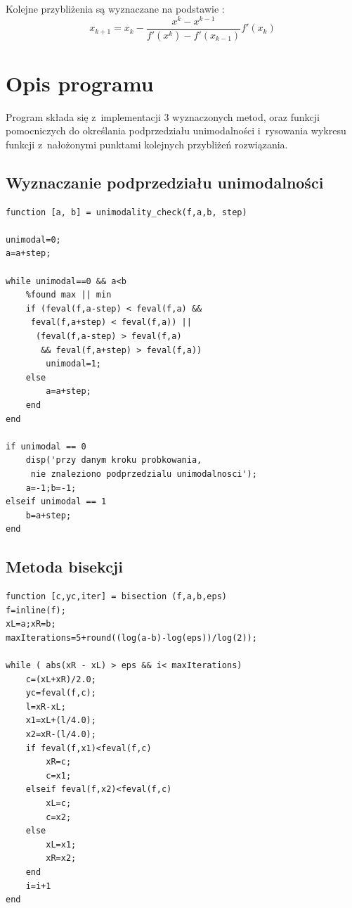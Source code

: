 \documentclass{classrep}
\begin{document}
Kolejne przybliżenia są wyznaczane na podstawie :
\begin{equation}
x_{k+1} = x_k - \frac{x^k-x^{k-1}}{f'(x^k)-f'(x_{k-1})} f'(x_k)
\end{equation}

\section{Opis programu}

Program składa się z~implementacji 3 wyznaczonych metod, oraz funkcji pomocniczych do określania podprzedziału unimodalności i~rysowania wykresu funkcji z~nałożonymi punktami kolejnych przybliżeń rozwiązania.

\subsection{Wyznaczanie podprzedziału unimodalności}
\begin{lstlisting}
function [a, b] = unimodality_check(f,a,b, step)

unimodal=0;
a=a+step;

while unimodal==0 && a<b
    %found max || min
    if (feval(f,a-step) < feval(f,a) &&
     feval(f,a+step) < feval(f,a)) ||
      (feval(f,a-step) > feval(f,a)
       && feval(f,a+step) > feval(f,a))
        unimodal=1;
    else
        a=a+step;
    end
end

if unimodal == 0
    disp('przy danym kroku probkowania,
     nie znaleziono podprzedzialu unimodalnosci');
    a=-1;b=-1; 
elseif unimodal == 1
    b=a+step;
end
\end{lstlisting}

\subsection{Metoda bisekcji}
\begin{lstlisting}
function [c,yc,iter] = bisection (f,a,b,eps)
f=inline(f);
xL=a;xR=b;
maxIterations=5+round((log(a-b)-log(eps))/log(2));

while ( abs(xR - xL) > eps && i< maxIterations)
    c=(xL+xR)/2.0;
    yc=feval(f,c);
    l=xR-xL;
    x1=xL+(l/4.0);
    x2=xR-(l/4.0);
    if feval(f,x1)<feval(f,c)
        xR=c;
        c=x1;
    elseif feval(f,x2)<feval(f,c)
        xL=c;
        c=x2;
    else
        xL=x1;
        xR=x2;
    end
    i=i+1
end
\end{lstlisting}
\end{document}
